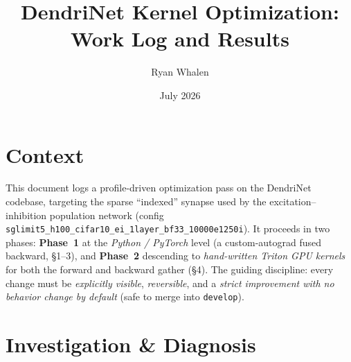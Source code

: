 \documentclass[11pt]{article}
\title{DendriNet Kernel Optimization: Work Log and Results}
\author{Ryan Whalen}
\date{July 2026}
\begin{document}
\maketitle

\section*{Context}
This document logs a profile-driven optimization pass on the DendriNet codebase, targeting
the sparse ``indexed'' synapse used by the excitation--inhibition population network
(config \texttt{sglimit5\_h100\_cifar10\_ei\_1layer\_bf33\_10000e1250i}). It proceeds in two
phases: \textbf{Phase~1} at the \emph{Python / PyTorch} level (a custom-autograd fused
backward, \S1--3), and \textbf{Phase~2} descending to \emph{hand-written Triton GPU kernels}
for both the forward and backward gather (\S4). The guiding
discipline: every change must be \emph{explicitly visible}, \emph{reversible}, and a
\emph{strict improvement with no behavior change by default} (safe to merge into
\texttt{develop}).

\begin{center}
\end{center}

\section{Investigation \& Diagnosis}
\end{document}
